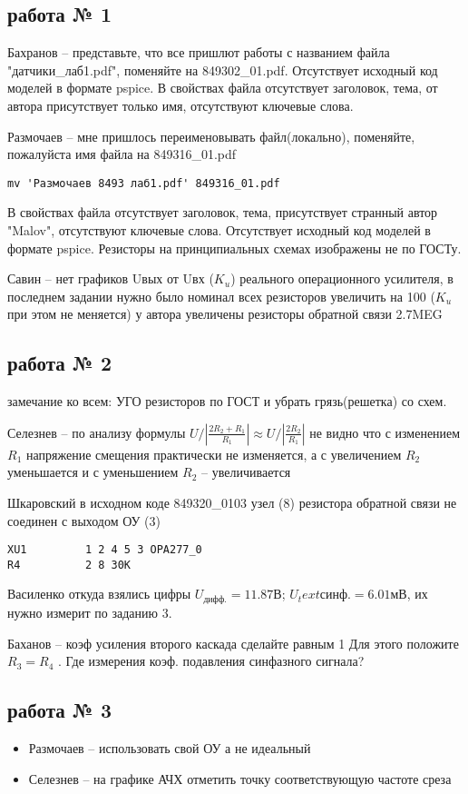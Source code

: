\documentclass[a4paper,landscape,11pt]{article}
\begin{document}
\subsection{работа № 1}
Бахранов  -- представьте, что все пришлют работы с названием файла "датчики\_лаб1.pdf", поменяйте на  849302\_01.pdf. Отсутствует исходный код моделей в формате pspice.
В свойствах файла отсутствует заголовок, тема, от автора присутствует только имя, отсутствуют ключевые слова.

Размочаев -- мне пришлось переименовывать файл(локально), поменяйте, пожалуйста имя файла на  849316\_01.pdf
\begin{verbatim}
mv 'Размочаев 8493 лаб1.pdf' 849316_01.pdf
\end{verbatim}
В свойствах файла отсутствует заголовок, тема, присутствует странный автор "Malov", отсутствуют ключевые слова. Отсутствует исходный код моделей в формате pspice.
Резисторы на принципиальных схемах изображены не по ГОСТу.

Савин -- нет графиков Uвых от Uвх ($K_u$) реального операционного усилителя, в последнем задании нужно было номинал всех  резисторов увеличить на 100 ($K_u$ при этом не меняется) 
у автора увеличены резисторы обратной связи 2.7MEG 

\subsection{работа № 2}

замечание ко всем: УГО резисторов по ГОСТ и убрать грязь(решетка) со схем.

Селезнев -- по анализу формулы $U/|\frac{2R_2 + R_1}{R_1}| \approx U/|\frac{2R_2}{R_1}|$ не видно что с изменением $R_1$
напряжение смещения практически не изменяется, а с увеличением $R_2$
уменьшается и с уменьшением $R_2$ – увеличивается


Шкаровский в исходном коде 849320\_0103 узел (8) резистора обратной связи не соединен с выходом ОУ (3)
\begin{verbatim}
XU1         1 2 4 5 3 OPA277_0
R4          2 8 30K
\end{verbatim}

Василенко  откуда взялись цифры  $U_\text{дифф.} = 11.87 В$; $U_text{синф.} = 6.01мВ$, их нужно измерит по заданию 3.

Баханов -- коэф усиления второго каскада сделайте равным 1 Для этого положите $R_3=R_4$ . Где измерения коэф. подавления синфазного сигнала?


\subsection{работа № 3}
\begin{itemize}
\item Размочаев -- использовать свой ОУ а не идеальный	
\item Селезнев	-- на графике АЧХ отметить точку соответствующую частоте среза
\end{itemize}
\end{document}
